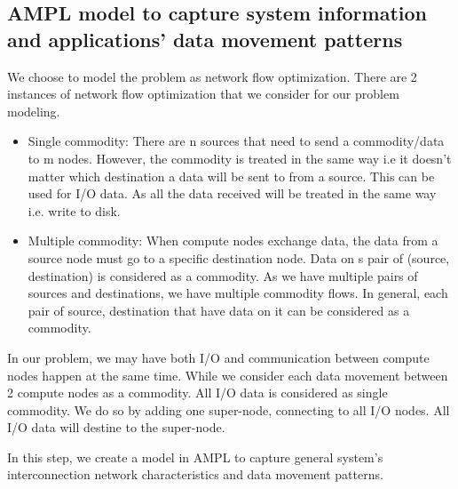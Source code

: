 \documentclass[letter]{article}
\begin{document}
\subsection {AMPL model to capture system information and applications' data movement patterns}

We choose to model the problem as network flow optimization. There are 2 instances of network flow optimization that we consider for our problem modeling.

\begin{itemize}
\item Single commodity: There are n sources that need to send a commodity/data to m nodes. However, the commodity is treated in the same way i.e it doesn't matter which destination a data will be sent to from a source. This can be used for I/O data. As all the data received will be treated in the same way i.e. write to disk.
\item Multiple commodity: When compute nodes exchange data, the data from a source node must go to a specific destination node. Data on s pair of (source, destination) is considered as a commodity. As we have multiple pairs of sources and destinations, we have multiple commodity flows. In general, each pair of source, destination that have data on it can be considered as a commodity.
\end{itemize}

In our problem, we may have both I/O and communication between compute nodes happen at the same time. While we consider each data movement between 2 compute nodes as a commodity. All I/O data is considered as single commodity. We do so by adding one super-node, connecting to all I/O nodes. All I/O data will destine to the super-node.

In this step, we create a model in AMPL to capture general system's interconnection network characteristics and data movement patterns.
\end{document}
